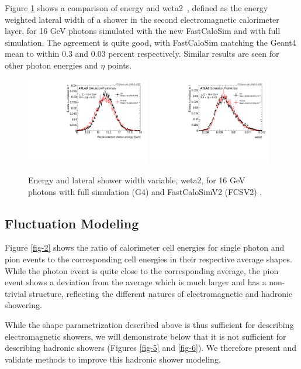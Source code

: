 Figure \ref{fig-1} shows a comparison of energy and weta2~\cite{ATLAS-CONF-2010-077}, defined as the energy weighted lateral width of a 
shower in the second electromagnetic calorimeter layer, for 16 GeV photons simulated with the new FastCaloSim and with full 
\GEANT simulation. The agreement is quite good, with FastCaloSim matching the Geant4 mean to within 0.3 and 0.03 percent 
respectively. Similar results are seen for other photon energies and $\eta$ points.
\begin{figure}[ht!]
\centering
\includegraphics[width=0.48\textwidth]{figures/CHEP-photon-energy.pdf}
\includegraphics[width=0.48\textwidth]{figures/CHEP-photon-weta2.pdf}
\caption{Energy and lateral shower width variable, weta2, for 16 GeV photons with full simulation (G4) and FastCaloSimV2 (FCSV2) \cite{ATL-SOFT-PUB-2018-002}.}
\label{fig-1} 
\end{figure}


\subsection{Fluctuation Modeling}
\label{fluct-modeling}
Figure \ref{fig-2} shows the ratio of calorimeter cell energies for single \GEANT photon and pion events to the corresponding 
cell energies in their respective average shapes. While the photon event is quite close to the corresponding average, the 
pion event shows a deviation from the average which is much larger and has a non-trivial structure, reflecting the different 
natures of electromagnetic and hadronic showering.

While the shape parametrization described above is thus sufficient for describing electromagnetic showers, we will demonstrate below that it is not sufficient for describing hadronic showers (Figures \ref{fig-5} and \ref{fig-6}). We therefore present and validate methods to improve this hadronic shower modeling.

